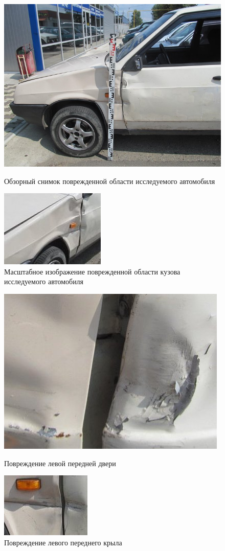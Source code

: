 \begin{figure}[!h]\centering
	\parbox[t]{0.49\textwidth}
	{\centering
		\includegraphics[width=.49\textwidth]{images/tc2}
		\caption{\footnotesize {Обзорный снимок поврежденной области исследуемого автомобиля }}
		\label{ris:images/tc2}}
	\hfil \hfil
	\parbox[t]{0.49\textwidth}
	{\centering
		\includegraphics[width=.49\textwidth]{images/tc3}
		\caption{\footnotesize {Масштабное изображение  поврежденной области кузова исследуемого автомобиля}}
		\label{ris:images/tc3}}
	
\end{figure}



\begin{figure}[!h]\centering
	\parbox[t]{0.49\textwidth}
	{\centering
		\includegraphics[width=.49\textwidth]{images/tc8}
		\caption{\footnotesize {Повреждение левой передней двери }}
		\label{ris:images/tc8}}
	\hfil \hfil
	\parbox[t]{0.49\textwidth}
	{\centering
		\includegraphics[width=.49\textwidth]{images/tc9}
		\caption{\footnotesize {Повреждение левого переднего крыла}}
		\label{ris:images/tc9}}
	
\end{figure}

